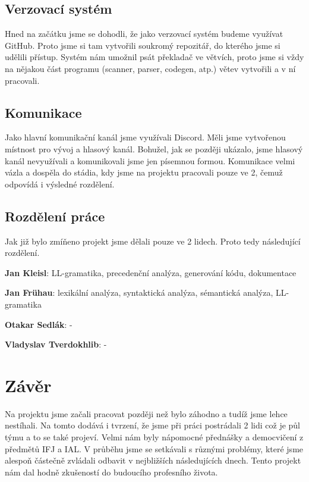\documentclass[a4paper, 11pt]{article}
\begin{document}
    \subsection{Verzovací systém}
    
    Hned na začátku jsme se dohodli, že jako verzovací systém budeme využívat GitHub. Proto jsme si tam vytvořili soukromý repozitář, do kterého jsme si udělili přístup. Systém nám umožnil psát překladač ve větvích, proto jsme si vždy na nějakou část programu (scanner, parser, codegen, atp.) větev vytvořili a v ní pracovali.
    
    \subsection{Komunikace}
    
    Jako hlavní komunikační kanál jsme využívali Discord. Měli jsme vytvořenou místnost pro vývoj a hlasový kanál. Bohužel, jak se později ukázalo, jsme hlasový kanál nevyužívali a komunikovali jsme jen písemnou formou. Komunikace velmi vázla a dospěla do stádia, kdy jsme na projektu pracovali pouze ve 2, čemuž odpovídá i výsledné rozdělení.
    
    \newpage
    
    \subsection{Rozdělení práce}
    
    Jak již bylo zmíňeno projekt jsme dělali pouze ve 2 lidech. Proto tedy následující rozdělení.
    
    \textbf{Jan Kleisl}: LL-gramatika, precedenční analýza, generování kódu, dokumentace
    
    \textbf{Jan Frühau}: lexikální analýza, syntaktická analýza, sémantická analýza, LL-gramatika
    
    \textbf{Otakar Sedlák}: -
    
    \textbf{Vladyslav Tverdokhlib}: -
    
    \section{Závěr}
    
    Na projektu jsme začali pracovat později než bylo záhodno a tudíž jsme lehce nestíhali. Na tomto dodává i tvrzení, že jsme při práci postrádali 2 lidi což je půl týmu a to se také projeví. Velmi nám byly nápomocné přednášky a democvičení z předmětů IFJ a IAL. V průběhu jsme se setkávali s různými problémy, které jsme alespoň částečně zvládali odbavit v nejbližších následujících dnech. Tento projekt nám dal hodně zkušeností do budoucího profesního života.
    
\end{document}
